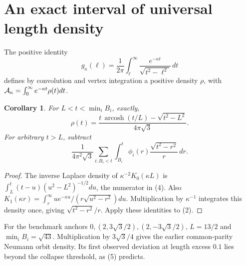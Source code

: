 \documentclass[11pt]{article}
\newtheorem{corollary}[theorem]{Corollary}
\begin{document}
\section{An exact interval of universal length density}
The positive identity
\[
 g_\kappa(\ell)=\frac1{2\pi}
 \int_\ell^\infty\frac{e^{-\kappa t}}{\sqrt{t^2-\ell^2}}\,dt
\]
defines by convolution and vertex integration a positive density
\(\rho\), with \({\cal A}_\kappa=\int_0^\infty e^{-\kappa t}\rho(t)dt\).
\begin{corollary}
For \(L<t<\min_iB_i\), exactly,
\[
 \boxed{\displaystyle
 \rho(t)=\frac{t\,\operatorname{arcosh}(t/L)-\sqrt{t^2-L^2}}
 {4\pi\sqrt3}.}
 \tag{4}
\]
For arbitrary \(t>L\), subtract
\[
 \frac1{4\pi^2\sqrt3}\sum_{i:B_i<t}
 \int_{B_i}^t\phi_i(r)\frac{\sqrt{t^2-r^2}}r\,dr.
 \tag{5}
\]
\end{corollary}
\begin{proof}
The inverse Laplace density of \(\kappa^{-2}K_0(\kappa L)\) is
\(\int_L^t(t-u)(u^2-L^2)^{-1/2}du\), the numerator in (4).
Also \(K_1(\kappa r)=\int_r^\infty
u e^{-\kappa u}/(r\sqrt{u^2-r^2})du\).
Multiplication by \(\kappa^{-1}\) integrates this density once,
giving \(\sqrt{t^2-r^2}/r\). Apply these identities to (2).
\end{proof}
For the benchmark anchors \(0,(2,3\sqrt3/2),(2,-3\sqrt3/2)\),
\(L=13/2\) and \(\min_iB_i=\sqrt{43}\).
Multiplication by \(3\sqrt3/4\) gives the earlier common-parity
Neumann orbit density. Its first observed deviation at length excess
\(0.1\) lies beyond the collapse threshold, as (5) predicts.
\end{document}
